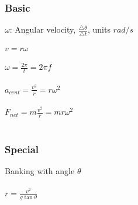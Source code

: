 \documentclass[11pt]{article}
\begin{document}
    \subsubsection{Basic}
    $\omega$: Angular velocity, $\frac{\bigtriangleup\theta}{\bigtriangleup t}$, units $rad/s$ \\ \\
    $v = r\omega$ \\ \\
    $\omega = \frac{2\pi}{t} = 2\pi f$ \\ \\
    $a_{cent} = \frac{v^2}{r} = r\omega^2$ \\ \\
    $F_{net} = m\frac{v^2}{r} = mr\omega^2$ \\ \\

    \subsubsection{Special}
    Banking with angle $\theta$ \\ \\
    $r = \frac{v^2}{g \tan \theta}$
\end{document}
